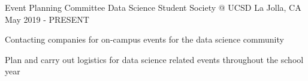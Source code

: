 
\begin{cventries}
  \cventry
    {Event Planning Committee} %
    {Data Science Student Society @ UCSD} %
    {La Jolla, CA} %
    {May 2019 - PRESENT} %
    {
      \begin{cvitems} %
        \item {Contacting companies for on-campus events for the data science community}
        \item {Plan and carry out logistics for data science related events throughout the school year}
      \end{cvitems}
    }
\end{cventries}
